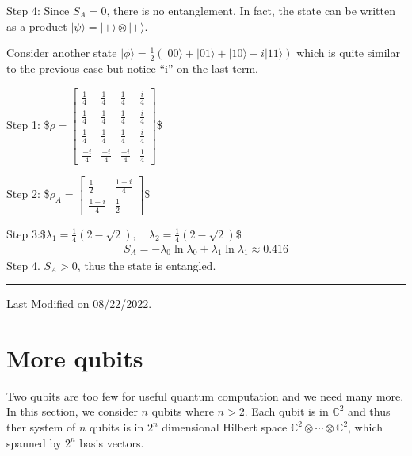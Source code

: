 \documentclass[letterpaper,10pt,english]{jupyterBook}
\begin{document}
\sphinxAtStartPar
Step 4:  Since \(S_A=0\), there is no entanglement.  In fact, the state can be written as a product \(|\psi\rangle = |+\rangle \otimes |+\rangle\).

\sphinxAtStartPar
Consider another state \(|\phi \rangle = \frac{1}{2}\left(|00\rangle + |01\rangle + |10\rangle + i |11\rangle \right)\) which is quite similar to the previous case but notice “i” on the last term.

\sphinxAtStartPar
Step 1:
\$\(
\rho = \begin{bmatrix} \frac{1}{4} & \frac{1}{4} & \frac{1}{4} & \frac{i}{4} \\ \frac{1}{4} & \frac{1}{4} & \frac{1}{4} & \frac{i}{4} \\ \frac{1}{4} & \frac{1}{4} & \frac{1}{4} & \frac{i}{4} \\ \frac{-i}{4} & \frac{-i}{4} & \frac{-i}{4} & \frac{1}{4} \end{bmatrix}
\)\$

\sphinxAtStartPar
Step 2:
\$\(
\rho_A = \begin{bmatrix} \frac{1}{2} & \frac{1+i}{4} \\ \frac{1-i}{4} & \frac{1}{2} \end{bmatrix}
\)\$

\sphinxAtStartPar
Step 3:\$\(
\lambda_1 = \frac{1}{4}\left(2-\sqrt{2}\right), \quad \lambda_2=\frac{1}{4}\left(2-\sqrt{2}\right)
\)\$
\begin{equation*}
\begin{split}
S_A = - \lambda_0 \ln \lambda_0 + \lambda_1 \ln \lambda_1 \approx 0.416
\end{split}
\end{equation*}
\sphinxAtStartPar
Step 4.
\(S_A > 0\), thus the state is entangled.


\bigskip\hrule\bigskip


\sphinxAtStartPar
Last Modified on 08/22/2022.

\sphinxstepscope


\section{More qubits}
\label{\detokenize{composites/morequbits:more-qubits}}\label{\detokenize{composites/morequbits:sec-more-qubits}}\label{\detokenize{composites/morequbits::doc}}
\sphinxAtStartPar
Two qubits are too few for useful quantum computation and we need many more. In this section, we consider \(n\) qubits where \(n>2\).  Each qubit is in \(\mathbb{C}^2\) and thus  ther system of \(n\) qubits is in \(2^n\) dimensional Hilbert space \(\mathbb{C}^2 \otimes \cdots \otimes \mathbb{C}^2\), which spanned by \(2^n\) basis vectors.
\end{document}
